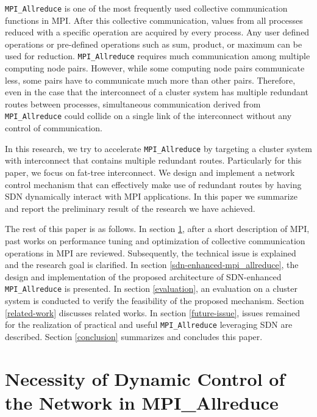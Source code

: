 \texttt{MPI\_Allreduce} is one of the most frequently used collective
communication functions in MPI. After this collective communication,
values from all processes reduced with a specific operation are acquired
by every process. Any user defined operations or pre-defined operations
such as sum, product, or maximum can be used for reduction.
\texttt{MPI\_Allreduce} requires much communication among multiple
computing node pairs. However, while some computing node pairs
communicate less, some pairs have to communicate much more than other
pairs. Therefore, even in the case that the interconnect of a cluster
system has multiple redundant routes between processes, simultaneous
communication derived from \texttt{MPI\_Allreduce} could collide on a
single link of the interconnect without any control of communication.

In this research, we try to accelerate \texttt{MPI\_Allreduce} by
targeting a cluster system with interconnect that contains multiple
redundant routes. Particularly for this paper, we focus on fat-tree
interconnect. We design and implement a network control mechanism that
can effectively make use of redundant routes by having SDN dynamically
interact with MPI applications. In this paper we summarize and report
the preliminary result of the research we have achieved.

The rest of this paper is as follows. In section
\ref{necessity-of-dynamic-control-of-the-network-in-mpi_allreduce},
after a short description of MPI, past works on performance tuning and
optimization of collective communication operations in MPI are reviewed.
Subsequently, the technical issue is explained and the research goal is
clarified. In section \ref{sdn-enhanced-mpi_allreduce}, the design and
implementation of the proposed architecture of SDN-enhanced
\texttt{MPI\_Allreduce} is presented. In section \ref{evaluation}, an
evaluation on a cluster system is conducted to verify the feasibility of
the proposed mechanism. Section \ref{related-work} discusses related
works. In section \ref{future-issue}, issues remained for the
realization of practical and useful \texttt{MPI\_Allreduce} leveraging
SDN are described. Section \ref{conclusion} summarizes and concludes
this paper.

\hypertarget{necessity-of-dynamic-control-of-the-network-in-mpi_allreduce}{%
\section{Necessity of Dynamic Control of the Network in
MPI\_Allreduce}\label{necessity-of-dynamic-control-of-the-network-in-mpi_allreduce}}

